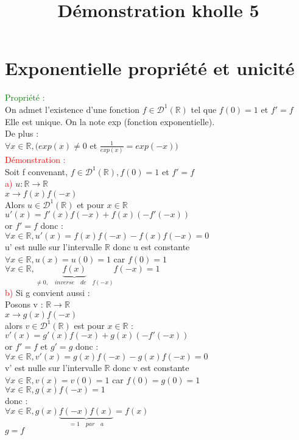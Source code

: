 \documentclass{article}
\begin{document}
\title{Démonstration kholle 5}
\date{}
\maketitle
	\renewcommand{\thesection}{\Roman{section}}
	\setlength{\parindent}{1.5cm}
	\section{Exponentielle propriété et unicité}
	\textcolor{green}{Propriété :} \\
	On admet l'existence d'une fonction $f \in \mathcal{D}^1(\mathbb{R})$ tel que $f(0)=1$ et $f'=f$ \\
	Elle est unique. On la note exp (fonction exponentielle). \\
	De plus : \\
	$\forall x \in \mathbb{R}, (exp(x) \neq 0$ et $\frac{1}{exp(x)} = exp(-x))$ \\
	\textcolor{red}{Démonstration :} \\ 
	Soit f convenant, $f \in \mathcal{D}^1(\mathbb{R}), f(0)=1$ et $f'=f$ \\
	\indent \textcolor{red}{a)} $u:\mathbb{R} \rightarrow \mathbb{R}$ \\
	\indent $x \rightarrow f(x)f(-x)$ \\
	Alors $u \in \mathcal{D}^1(\mathbb{R})$ et pour $x \in \mathbb{R}$ \\
	$u'(x)=f'(x)f(-x)+f(x)(-f'(-x))$ \\
	or $f'=f$ donc : \\
	$\forall x \in \mathbb{R}, u'(x)=f(x)f(-x)-f(x)f(-x)=0$ \\
	u' est nulle sur l'intervalle $\mathbb{R}$ donc u est constante \\
	$\forall x \in \mathbb{R}, u(x)=u(0)=1$ car $f(0)=1$ \\
	$\forall x \in \mathbb{R}, \underbrace{f(x)}_{\neq 0, \quad inverse \quad de \quad f(-x)} f(-x) =1$ \\
	\textcolor{red}{b)} Si g convient aussi : \\
	Posons v : $\mathbb{R} \rightarrow \mathbb{R}$ \\
	\indent $x \rightarrow g(x)f(-x)$ \\
	alors $v \in \mathcal{D}^1(\mathbb{R})$ est pour $x \in \mathbb{R}$ : \\
	$v'(x)=g'(x)f(-x)+g(x)(-f'(-x))$ \\
	or $f'=f$ et $g'=g$ donc : \\
	$\forall x \in \mathbb{R}, v'(x)=g(x)f(-x)-g(x)f(-x)=0$ \\
	v' est nulle sur l'intervalle $\mathbb{R}$ donc v est constante \\
	$\forall x \in \mathbb{R}, v(x) =v(0)=1$ car $f(0)=g(0)=1$ \\
	$\forall x \in \mathbb{R}, g(x)f(-x)=1$ \\
	donc : \\
	$\forall x \in \mathbb{R}, g(x)\underbrace{f(-x)f(x)}_{=1 \quad par \quad a} =f(x)$ \\
	$g=f$ \\
\end{document}
